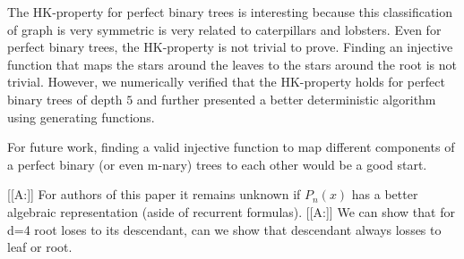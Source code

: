 \documentclass[10pt]{amsart}
\theoremstyle{definition}
\begin{document}
The HK-property for perfect binary trees is interesting because this classification of graph is very symmetric is very related to caterpillars and lobsters. Even for perfect binary trees, the HK-property is not trivial to prove. Finding an injective function that maps the stars around the leaves to the stars around the root is not trivial. However, we numerically verified that the HK-property holds for perfect binary trees of depth $5$ and further presented a better deterministic algorithm using generating functions.

For future work, finding a valid injective function to map different components of a perfect binary (or even m-nary) trees to each other would be a good start.

	[[A:]] For authors of this paper it remains unknown if $P_n(x)$ has a  better algebraic representation (aside of recurrent formulas).
	[[A:]] We can show that for d=4 root loses to its descendant, can we show that descendant always losses to leaf or root.
\newpage
\end{document}

